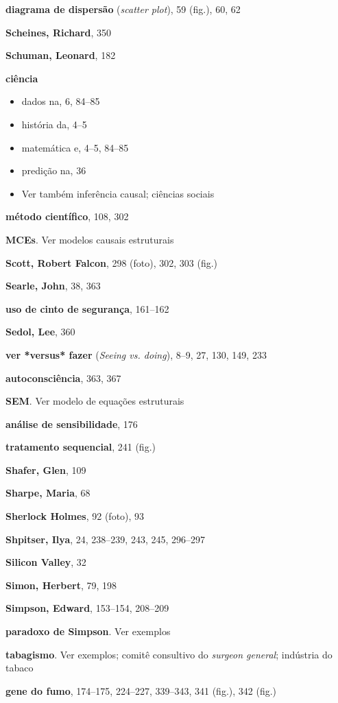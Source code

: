 \documentclass[11pt,a5paper,twoside]{book}
\begin{document}
\textbf{diagrama de dispersão} (\textit{scatter plot}), 59 (fig.), 60, 62

\textbf{Scheines, Richard}, 350

\textbf{Schuman, Leonard}, 182

\textbf{ciência}

\begin{itemize}
\item dados na, 6, 84–85
\item história da, 4–5
\item matemática e, 4–5, 84–85
\item predição na, 36
\item Ver também inferência causal; ciências sociais
\end{itemize}
\textbf{método científico}, 108, 302

\textbf{MCEs}. Ver modelos causais estruturais

\textbf{Scott, Robert Falcon}, 298 (foto), 302, 303 (fig.)

\textbf{Searle, John}, 38, 363

\textbf{uso de cinto de segurança}, 161–162

\textbf{Sedol, Lee}, 360

\textbf{ver *versus* fazer} (\textit{Seeing vs. doing}), 8–9, 27, 130, 149, 233

\textbf{autoconsciência}, 363, 367

\textbf{SEM}. Ver modelo de equações estruturais

\textbf{análise de sensibilidade}, 176

\textbf{tratamento sequencial}, 241 (fig.)

\textbf{Shafer, Glen}, 109

\textbf{Sharpe, Maria}, 68

\textbf{Sherlock Holmes}, 92 (foto), 93

\textbf{Shpitser, Ilya}, 24, 238–239, 243, 245, 296–297

\textbf{Silicon Valley}, 32

\textbf{Simon, Herbert}, 79, 198

\textbf{Simpson, Edward}, 153–154, 208–209

\textbf{paradoxo de Simpson}. Ver exemplos

\textbf{tabagismo}. Ver exemplos; comitê consultivo do \textit{surgeon general}; indústria do tabaco

\textbf{gene do fumo}, 174–175, 224–227, 339–343, 341 (fig.), 342 (fig.)
\end{document}

